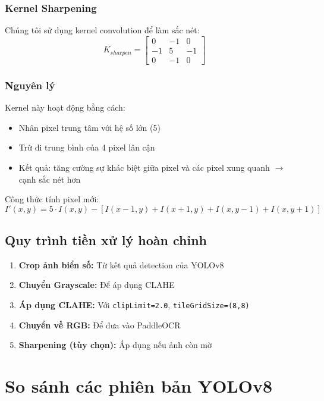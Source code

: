 \subsubsection{Kernel Sharpening}
Chúng tôi sử dụng kernel convolution để làm sắc nét:
\begin{equation}
    K_{sharpen} = \begin{bmatrix}
        0 & -1 & 0 \\
        -1 & 5 & -1 \\
        0 & -1 & 0
    \end{bmatrix}
\end{equation}

\subsubsection{Nguyên lý}
Kernel này hoạt động bằng cách:
\begin{itemize}
    \item Nhân pixel trung tâm với hệ số lớn (5)
    \item Trừ đi trung bình của 4 pixel lân cận
    \item Kết quả: tăng cường sự khác biệt giữa pixel và các pixel xung quanh $\rightarrow$ cạnh sắc nét hơn
\end{itemize}

Công thức tính pixel mới:
\begin{equation}
    I'(x,y) = 5 \cdot I(x,y) - [I(x-1,y) + I(x+1,y) + I(x,y-1) + I(x,y+1)]
\end{equation}

\subsection{Quy trình tiền xử lý hoàn chỉnh}
\begin{enumerate}
    \item \textbf{Crop ảnh biển số:} Từ kết quả detection của YOLOv8
    \item \textbf{Chuyển Grayscale:} Để áp dụng CLAHE
    \item \textbf{Áp dụng CLAHE:} Với \texttt{clipLimit=2.0}, \texttt{tileGridSize=(8,8)}
    \item \textbf{Chuyển về RGB:} Để đưa vào PaddleOCR
    \item \textbf{Sharpening (tùy chọn):} Áp dụng nếu ảnh còn mờ
\end{enumerate}

\section{So sánh các phiên bản YOLOv8}

